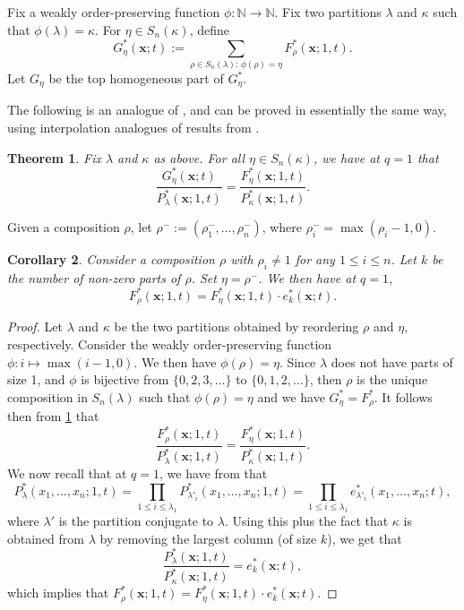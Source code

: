 \documentclass[12pt]{amsart}
\newtheorem{thm}{Theorem}[section]
\newtheorem{cor}[thm]{Corollary}
\theoremstyle{definition}
\newcommand{\bfx}{\boldsymbol{x}}
\newcommand{\NN}{\mathbb N}
\def\LW#1{(\textcolor{teal}{LW:#1})}
\begin{document}
Fix a weakly order-preserving function $\phi:\NN\rightarrow\NN$.  Fix two partitions $\lambda$ and $\kappa$ such that $\phi(\lambda)=\kappa$.
For $\eta\in S_n(\kappa)$, define 
$$G^*_\eta(\bfx;t):=\sum_{\rho\in S_n(\lambda):\, \phi(\rho)=\eta} F^*_\rho(\bfx;1,t).$$ Let $G_{\eta}$ be the top homogeneous part of $G^*_\eta$.


The following is an analogue of \cite[Theorem 4.18]{AyyerMartinWilliams2025}, and 
can be proved in essentially the same way, using interpolation analogues of results from \cite{AlexanderssonSawhney2019}.

\begin{thm}\label{thm:weak-reordering}
    Fix $\lambda$ and $\kappa$ as above. For all $\eta\in S_n(\kappa)$, we have at $q=1$ that 
    $$\frac{G^*_\eta(\bfx;t)}{P^*_\lambda(\bfx;1,t)}=\frac{F^*_\eta(\bfx;1,t)}{P^*_\kappa(\bfx;1,t)}.$$
\end{thm}


Given a composition $\rho$, let $\rho^-:=(\rho^-_1,\dots,\rho^-_n)$,
where
$\rho^-_i=\max(\rho_i-1,0)$.
\begin{cor}\label{cor:eta_minus}
    Consider a composition $\rho$ with $\rho_i\neq 1$ for any $1\leq i\leq n$. Let $k$ be the number of non-zero parts of $\rho$. Set $\eta=\rho^-$.
    We then have at $q=1$,
$$F^*_{\rho}(\bfx;1,t)=F^*_{\eta}(\bfx;1,t)\cdot e^*_{k}(\bfx;t).$$
\end{cor}
\begin{proof}
Let $\lambda$ and $\kappa$ be the two partitions obtained by reordering $\rho$ and $\eta$, respectively.
  Consider the weakly order-preserving function $\phi:i\mapsto \max(i-1,0)$. We then have $\phi(\rho)=\eta$. Since $\lambda$ does not have parts of size 1, and $\phi$ is bijective from $\{0,2,3,\dots\}$ to $\{0,1,2,\dots\}$, then $\rho$ is the unique composition in $S_n(\lambda)$ such that $\phi(\rho)=\eta$ and we have $G^*_\eta=F^*_\rho$. It follows then from \cref{thm:weak-reordering} that
  $$\frac{F^*_{\rho}(\bfx;1,t)}{P^*_{\lambda}(\bfx;1,t)}=\frac{F^*_{\eta}(\bfx;1,t)}{P^*_{\kappa}(\bfx;1,t)}.$$
We now recall that at $q=1$, we have from \cite{Dolega2017,BenDaliWilliams2025} that 
    \begin{equation}\label{eq:factorization}
      P^*_\lambda(x_1,\dots,x_n;1,t)=\prod_{1\leq i\leq \lambda_1}P^*_{\lambda'_i}(x_1,\dots,x_n;1,t)=\prod_{1\leq i\leq \lambda_1}e^*_{\lambda'_i}(x_1,\dots,x_n;t),
    \end{equation}
    where $\lambda'$ is the partition conjugate to $\lambda$.  Using this plus the fact that $\kappa$ is obtained from $\lambda$ by removing the largest column (of size $k$), we get that
$$\frac{P^*_{\lambda}(\bfx;1,t)}{P^*_{\kappa}(\bfx;1,t)}=e^*_{k}(\bfx;t),$$
which implies that $F^*_{\rho}(\bfx;1,t)=F^*_{\eta}(\bfx;1,t)\cdot e^*_{k}(\bfx;t).$
\end{proof}
\end{document}
